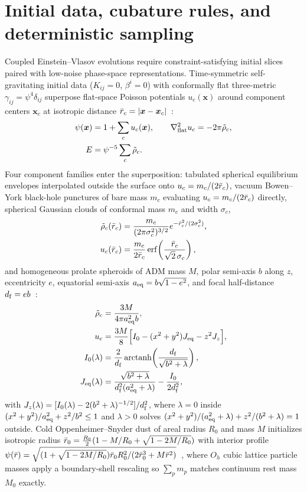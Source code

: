 \section{Initial data, cubature rules, and deterministic sampling}\label{app:sampling}

Coupled Einstein--Vlasov evolutions require constraint-satisfying initial slices paired with low-noise phase-space representations. Time-symmetric self-gravitating initial data ($K_{ij} = 0$, $\beta^i = 0$) with conformally flat three-metric $\gamma_{ij} = \psi^4\delta_{ij}$ superpose flat-space Poisson potentials $u_c(\bm{x})$ around component centers $\bm{x}_c$ at isotropic distance $\bar{r}_c = |\bm{x} - \bm{x}_c|$~\cite{Wu:2026nrpic}:
\begin{align}\label{eq:app_superposition}
\psi(\bm{x}) &= 1 + \sum_c u_c(\bm{x}), \qquad
\nabla_{\rm flat}^2 u_c = -2\pi\tilde{\rho}_c, \nonumber\\
E &= \psi^{-5}\sum_c \tilde{\rho}_c.
\end{align}
Four component families enter the superposition: tabulated spherical equilibrium envelopes interpolated outside the surface onto $u_c = m_c/(2\bar{r}_c)$, vacuum Bowen--York black-hole punctures of bare mass $m_c$ evaluating $u_c = m_c/(2\bar{r}_c)$ directly, spherical Gaussian clouds of conformal mass $m_c$ and width $\sigma_c$,
\begin{align}\label{eq:app_gaussian}
\tilde{\rho}_c(\bar{r}_c) &= \frac{m_c}{(2\pi\sigma_c^2)^{3/2}}e^{-\bar{r}_c^2/(2\sigma_c^2)}, \nonumber\\
u_c(\bar{r}_c) &= \frac{m_c}{2\bar{r}_c}\operatorname{erf}\!\left(\frac{\bar{r}_c}{\sqrt{2}\,\sigma_c}\right),
\end{align}
and homogeneous prolate spheroids of ADM mass $M$, polar semi-axis $b$ along $z$, eccentricity $e$, equatorial semi-axis $a_{\rm eq} = b\sqrt{1-e^2}$, and focal half-distance $d_{\rm f} = eb$~\cite{Shapiro:1991zza,Yoo:2016kzu}:
\begin{align}\label{eq:app_spheroid}
\tilde{\rho}_c &= \frac{3M}{4\pi a_{\rm eq}^2 b}, \nonumber\\
u_c &= \frac{3M}{8}\Bigl[I_0 - (x^2+y^2)J_{\rm eq} - z^2 J_z\Bigr], \nonumber\\
I_0(\lambda) &= \frac{2}{d_{\rm f}}\operatorname{arctanh}\!\left(\frac{d_{\rm f}}{\sqrt{b^2+\lambda}}\right), \nonumber\\
J_{\rm eq}(\lambda) &= \frac{\sqrt{b^2+\lambda}}{d_{\rm f}^2(a_{\rm eq}^2+\lambda)} - \frac{I_0}{2d_{\rm f}^2},
\end{align}
with $J_z(\lambda) = [I_0(\lambda) - 2(b^2+\lambda)^{-1/2}]/d_{\rm f}^2$, where $\lambda = 0$ inside $(x^2+y^2)/a_{\rm eq}^2 + z^2/b^2 \le 1$ and $\lambda > 0$ solves $(x^2+y^2)/(a_{\rm eq}^2+\lambda) + z^2/(b^2+\lambda) = 1$ outside. Cold Oppenheimer--Snyder dust of areal radius $R_0$ and mass $M$ initializes isotropic radius $\bar{r}_0 = \frac{R_0}{2}(1 - M/R_0 + \sqrt{1 - 2M/R_0})$ with interior profile $\psi(\bar{r}) = \sqrt{(1 + \sqrt{1-2M/R_0})\bar{r}_0 R_0^2/(2\bar{r}_0^3 + M\bar{r}^2)}$~\cite{Staley:2011ss}, where $O_h$ cubic lattice particle masses apply a boundary-shell rescaling so $\sum_p m_p$ matches continuum rest mass $M_0$ exactly.

